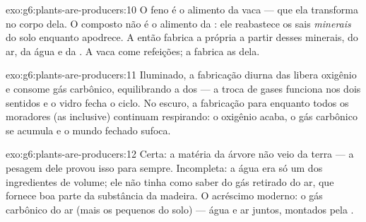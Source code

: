 \begin{solution}{exo:g6:plants-are-producers:10}
O feno é o alimento da vaca ---  que ela transforma no
corpo dela. O composto não é o alimento da : ele reabastece os
sais \emph{minerais} do solo enquanto apodrece. A  então fabrica
a própria  a partir desses minerais, do ar, da água e
da . A vaca come refeições; a  fabrica as dela.
\end{solution}

\begin{solution}{exo:g6:plants-are-producers:11}
Iluminado, a fabricação diurna das  libera oxigênio e consome
gás carbônico, equilibrando a  dos  --- a troca de
gases funciona nos dois sentidos e o vidro fecha o ciclo. No escuro, a
fabricação para enquanto todos os moradores (as  inclusive)
continuam respirando: o oxigênio acaba, o gás carbônico se acumula e o
mundo fechado sufoca.
\end{solution}

\begin{solution}{exo:g6:plants-are-producers:12}
Certa: a matéria da árvore não veio da terra --- a pesagem dele provou
isso para sempre. Incompleta: a água era só um dos ingredientes de
volume; ele não tinha como saber do gás retirado do ar, que fornece
boa parte da substância da madeira. O acréscimo moderno: o gás
carbônico do ar (mais os pequenos  do solo) --- água e ar
juntos, montados pela .
\end{solution}

